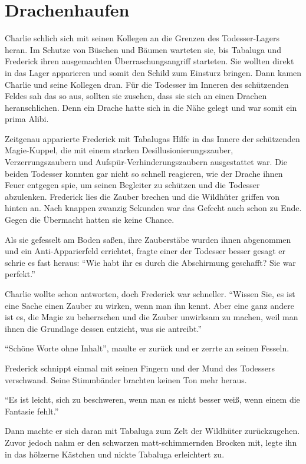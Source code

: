 \chapter{Drachenhaufen}


Charlie schlich sich mit seinen Kollegen an die Grenzen des Todesser-Lagers heran. Im Schutze von Büschen und Bäumen warteten sie, bis Tabaluga und Frederick ihren ausgemachten Überraschungsangriff starteten. Sie wollten direkt in das Lager apparieren und somit den Schild zum Einsturz bringen. Dann kamen Charlie und seine Kollegen dran. Für die Todesser im Inneren des schützenden Feldes sah das so aus, sollten sie zusehen, dass sie sich an einen Drachen heranschlichen. Denn ein Drache hatte sich in die Nähe gelegt und war somit ein prima Alibi.

Zeitgenau apparierte Frederick mit Tabalugas Hilfe in das Innere der schützenden Magie-Kuppel, die mit einem starken Desillusionierungszauber, Verzerrungszaubern und Aufspür-Verhinderungszaubern ausgestattet war. Die beiden Todesser konnten gar nicht so schnell reagieren, wie der Drache ihnen Feuer entgegen spie, um seinen Begleiter zu schützen und die Todesser abzulenken. Frederick lies die Zauber brechen und die Wildhüter griffen von hinten an. Nach knappen zwanzig Sekunden war das Gefecht auch schon zu Ende. Gegen die Übermacht hatten sie keine Chance.

Als sie gefesselt am Boden saßen, ihre Zauberstäbe wurden ihnen abgenommen und ein Anti-Apparierfeld errichtet, fragte einer der Todesser \gst besser gesagt er schrie es fast heraus: \enquote{Wie habt ihr es durch die Abschirmung geschafft? Sie war perfekt.}

Charlie wollte schon antworten, doch Frederick war schneller. \enquote{Wissen Sie, es ist eine Sache einen Zauber zu wirken, wenn man ihn kennt. Aber eine ganz andere ist es, die Magie zu beherrschen und die Zauber unwirksam zu machen, weil man ihnen die Grundlage dessen entzieht, was sie antreibt.}

\enquote{Schöne Worte ohne Inhalt}, maulte er zurück und er zerrte an seinen Fesseln.

Frederick schnippt einmal mit seinen Fingern und der Mund des Todessers verschwand. Seine Stimmbänder brachten keinen Ton mehr heraus.

\enquote{Es ist leicht, sich zu beschweren, wenn man es nicht besser weiß, wenn einem die Fantasie fehlt.}

Dann machte er sich daran mit Tabaluga zum Zelt der Wildhüter zurückzugehen. Zuvor jedoch nahm er den schwarzen matt-schimmernden Brocken mit, legte ihn in das hölzerne Kästchen und nickte Tabaluga erleichtert zu.

